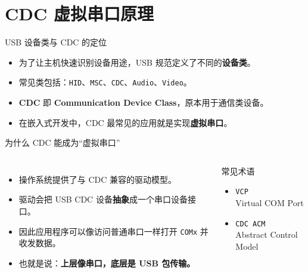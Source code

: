 \documentclass[11pt,aspectratio=169]{ctexbeamer}
\newcommand{\code}[1]{\texttt{#1}}
\newcommand{\term}[1]{\textbf{\color{PrimaryBlue}#1}}
\begin{document}
\section{CDC 虚拟串口原理}

\begin{frame}{USB 设备类与 CDC 的定位}
  \begin{itemize}
    \item 为了让主机快速识别设备用途，USB 规范定义了不同的\term{设备类}。
    \item 常见类包括：\code{HID}、\code{MSC}、\code{CDC}、\code{Audio}、\code{Video}。
    \item \term{CDC} 即 \term{Communication Device Class}，原本用于通信类设备。
    \item 在嵌入式开发中，CDC 最常见的应用就是实现\term{虚拟串口}。
  \end{itemize}
\end{frame}

\begin{frame}{为什么 CDC 能成为“虚拟串口”}
  \begin{columns}[T]
    \begin{itemize}
      \item 操作系统提供了与 CDC 兼容的驱动模型。
      \item 驱动会把 USB CDC 设备\term{抽象}成一个串口设备接口。
      \item 因此应用程序可以像访问普通串口一样打开 \code{COMx} 并收发数据。
      \item 也就是说：\term{上层像串口，底层是 USB 包传输。}
    \end{itemize}

    \begin{block}{常见术语}
      \begin{itemize}
        \item \code{VCP}\\Virtual COM Port
        \item \code{CDC ACM}\\Abstract Control Model
      \end{itemize}
    \end{block}
  \end{columns}
\end{frame}
\end{document}
